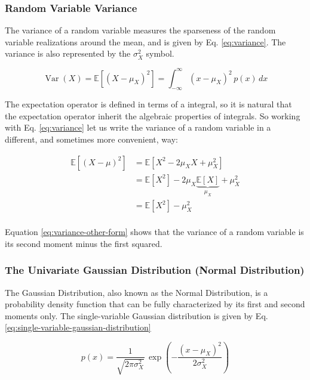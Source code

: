 \documentclass[12pt]{article}
\newcommand{\brac}[1]{\left[#1\right]} %
\newcommand{\expv}[1]{\mathbb{E}\brac{#1}} %
\begin{document}
\subsubsection{Random Variable Variance}
The variance of a random variable measures the sparseness of the random variable realizations around the mean, and is given by Eq. \ref{eq:variance}. The variance is also represented by the $\sigma_X^2$ symbol.

\begin{equation}
    \mathop{Var}(X) = \mathbb{E}\left[ (X - \mu_X)^2 \right] = \int_{-\infty}^{\infty} (x - \mu_X)^2 \, p(x) \, dx
    \label{eq:variance}
\end{equation}

The expectation operator is defined in terms of a integral, so it is natural that the expectation operator inherit the algebraic properties of integrals. So working with Eq. \ref{eq:variance} let us write the variance of a random variable in a different, and sometimes more convenient, way:

\begin{equation}
\begin{aligned}
    \mathbb{E}\left[(X-\mu)^2\right] &= \expv{ X^2 -2\mu_X X + \mu_X^2} \\
    &= \expv{X^2} - 2\mu_X \underbrace{\expv{X}}_{\mu_X} + \mu_X^2 \\
    &= \expv{X^2} - \mu_X^2 \\
\end{aligned}
\label{eq:variance-other-form}
\end{equation}

Equation \ref{eq:variance-other-form} shows that the variance of a random variable is its second moment minus the first squared.

\subsubsection{The Univariate Gaussian Distribution (Normal Distribution)}
The Gaussian Distribution, also known as the Normal Distribution, is a probability density function that can be fully characterized by its first and second moments only. The single-variable Gaussian distribution is given by Eq. \ref{eq:single-variable-gaussian-distribution}

\begin{equation}
    p(x) = \frac{1}{\sqrt{2\pi\sigma_X^2}} \, \exp{\left(-\dfrac{(x-\mu_X)^2}{2\sigma_X^2}\right)}
    \label{eq:single-variable-gaussian-distribution}
\end{equation}
\end{document}
